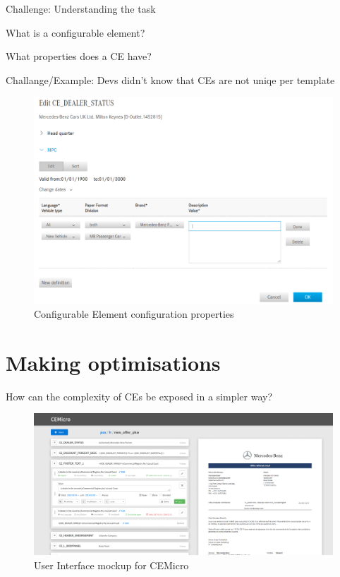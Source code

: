 Challenge: Understanding the task

What is a configurable element?

What properties does a CE have?

Challange/Example: Devs didn't know that CEs are not uniqe per template

\begin{figure}
  \centering
  \includegraphics[width=0.8\linewidth]{assets/pos-ce-config-4.png}
  \caption{Configurable Element configuration properties}
  \label{fig:ce-properties}
\end{figure}


\section{Making optimisations}

How can the complexity of CEs be exposed in a simpler way?

\begin{figure}
  \centering
  \includegraphics[width=\linewidth]{assets/cemicro-ui-mockup.png}
  \caption{User Interface mockup for CEMicro}
  \label{fig:mockup}
\end{figure}


